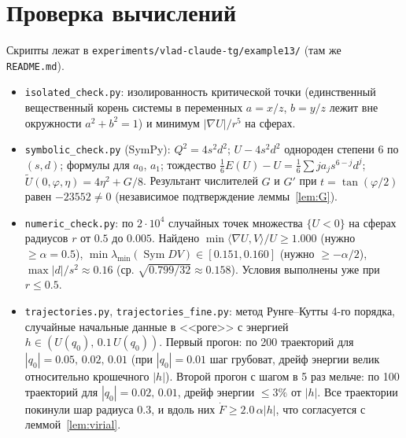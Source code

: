 \documentclass[11pt,a4paper]{article}
\theoremstyle{definition}
\DeclareMathOperator{\Sym}{Sym}
\newcommand{\tU}{\widetilde U}
\begin{document}
\section{Проверка вычислений}\label{sec:num}
Скрипты лежат в \nolinkurl{experiments/vlad-claude-tg/example13/} (там же \texttt{README.md}).
\begin{itemize}[leftmargin=*]
\item \texttt{isolated\_check.py}: изолированность критической точки (единственный вещественный корень
системы в переменных $a=x/z$, $b=y/z$ лежит вне окружности $a^2+b^2=1$) и минимум $|\nabla U|/r^5$ на сферах.
\item \texttt{symbolic\_check.py} (SymPy): $Q^2=4s^2d^2$; $U-4s^2d^2$ однороден степени 6 по $(s,d)$; формулы для $a_0$,
$a_1$; тождество $\frac16E(U)-U=\frac16\sum ja_js^{6-j}d^j$; $\tU(0,\varphi,\eta)=4\eta^2+G/8$. Результант числителей
$G$ и $G'$ при $t=\tan(\varphi/2)$ равен $-23552\ne0$ (независимое подтверждение леммы~\ref{lem:G}).
\item \texttt{numeric\_check.py}: по $2\cdot10^4$ случайных точек множества $\{U<0\}$ на сферах радиусов $r$ от $0.5$
до $0.005$. Найдено $\min\langle\nabla U,V\rangle/U\ge1.000$ (нужно $\ge\alpha=0.5$), $\min\lambda_{\min}(\Sym DV)\in[0.151,0.160]$
(нужно $\ge-\alpha/2$), $\max|d|/s^2\approx0.16$ (ср. $\sqrt{0.799/32}\approx0.158$). Условия выполнены уже при $r\le0.5$.
\item \texttt{trajectories.py}, \texttt{trajectories\_fine.py}: метод Рунге--Кутты 4-го порядка, случайные начальные
данные в <<роге>> с энергией $h\in(U(q_0),\,0.1\,U(q_0))$. Первый прогон: по 200 траекторий для $|q_0|=0.05,\,0.02,\,0.01$
(при $|q_0|=0.01$ шаг грубоват, дрейф энергии велик относительно крошечного $|h|$). Второй прогон с шагом в 5 раз мельче:
по 100 траекторий для $|q_0|=0.02,\,0.01$, дрейф энергии $\le3\%$ от $|h|$. Все траектории покинули шар радиуса $0.3$,
и вдоль них $\dot F\ge2.0\,\alpha|h|$, что согласуется с леммой~\ref{lem:virial}.
\end{itemize}
\end{document}
